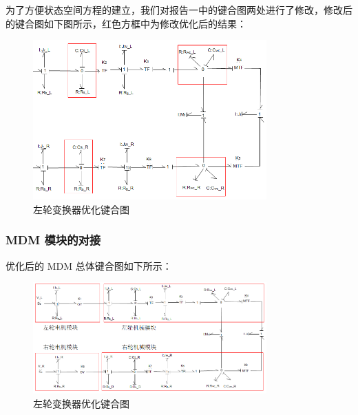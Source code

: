 为了方便状态空间方程的建立，我们对报告一中的键合图两处进行了修改，修改后的键合图如下图所示，红色方框中为修改优化后的结果：
\begin{figure}[H]
	\centering
	\includegraphics[width=0.8\textwidth]{fig/bond/MDM6.png}
	\caption{左轮变换器优化键合图}\label{fig:bond_MDM6}
\end{figure}

\subsubsection{MDM 模块的对接}

优化后的 MDM 总体键合图如下所示：
\begin{figure}[H]
	\centering
	\includegraphics[width=0.8\textwidth]{fig/bond/MDM7.png}
	\caption{左轮变换器优化键合图}\label{fig:bond_MDM7}
\end{figure}
